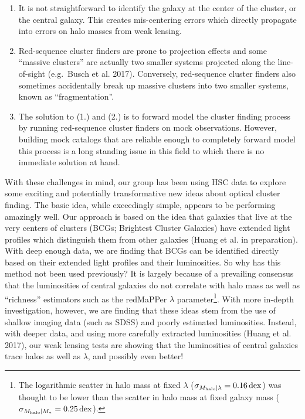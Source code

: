 \documentclass[letterpaper,12pt]{article}
\begin{document}
\begin{enumerate}
\item It is not straightforward to identify the galaxy at the center of the cluster, or the central galaxy. This
creates mis-centering errors which directly propagate into errors on halo masses from weak lensing.
\item Red-sequence cluster finders are prone to projection effects and some ``massive clusters'' are actually two
smaller systems projected along the line-of-sight (e.g.\ Busch et al. 2017). Conversely, red-sequence cluster finders
also sometimes accidentally break up massive clusters into two smaller systems, known as ``fragmentation''.
\item The solution to (1.) and (2.) is to forward model the cluster finding process by running red-sequence cluster
finders on mock observations. However, building mock catalogs that are reliable enough to completely forward model this
process is a long standing issue in this field to which there is no immediate solution at hand.
\end{enumerate}

With these challenges in mind, our group has been using HSC data to explore some exciting and potentially
transformative new ideas about optical cluster finding. The basic idea, while exceedingly simple, appears to be
performing amazingly well. Our approach is based on the idea that galaxies that live at the very centers of clusters
(BCGs; Brightest Cluster Galaxies) have extended light profiles which distinguish them from other galaxies
(Huang et al. in preparation). With deep enough data, we are finding that BCGs can be identified directly based on
their extended light profiles and their luminosities. So why has this method not been used previously? It is largely
because of a prevailing consensus that the luminosities of central galaxies do not correlate with halo mass as well as
``richness'' estimators such as the redMaPPer $\lambda$ parameter\footnote{The logarithmic scatter in halo mass at
fixed $\lambda$ ($\sigma_{M_{\rm halo}|\lambda}=0.16\,{\rm dex}$) was thought to be lower than the scatter in halo mass
at fixed galaxy mass ($\sigma_{M_{\rm halo}|M_*}=0.25\,{\rm dex}$).}. With more in-depth investigation, however, we are
finding that these ideas stem from the use of shallow imaging data (such as SDSS) and poorly estimated luminosities.
Instead, with deeper data, and using more carefully extracted luminosities (Huang et al. 2017), our weak lensing tests
are showing that the luminosities of central galaxies trace halos as well as $\lambda$, and possibly even better!
\end{document}
